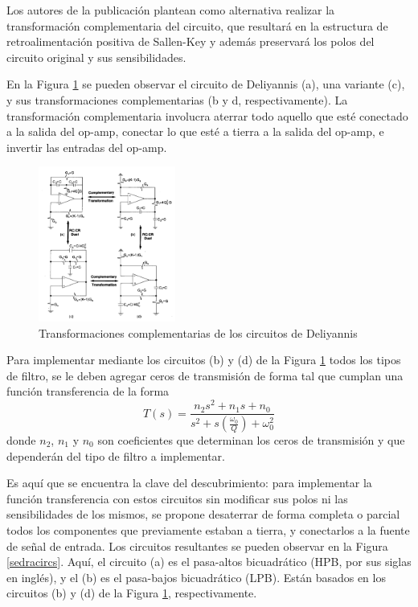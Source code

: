 \documentclass[spanish]{article}
\begin{document}
Los autores de la publicación plantean como alternativa realizar la transformación complementaria del circuito, que resultará en la estructura de retroalimentación positiva de Sallen-Key y además preservará los polos del circuito original y sus sensibilidades.

En la Figura \ref{salkey} se pueden observar el circuito de Deliyannis (a), una variante (c), y sus transformaciones complementarias (b y d, respectivamente). La transformación complementaria involucra aterrar todo aquello que esté conectado a la salida del op-amp, conectar lo que esté a tierra a la salida del op-amp, e invertir las entradas del op-amp.

\begin{figure}[H]
\begin{centering}
\includegraphics[width=0.4\textwidth]{Resources/sallenkeystructures.png}
\par\end{centering}
\caption{Transformaciones complementarias de los circuitos de Deliyannis}
\label{salkey}
\end{figure}

Para implementar mediante los circuitos (b) y (d) de la Figura \ref{salkey} todos los tipos de filtro, se le deben agregar ceros de transmisión de forma tal que cumplan una función transferencia de la forma 
\begin{equation*}
    T(s)=\frac{n_{2}s^2+n_{1}s+n_{0}}{s^2+s(\frac{\omega_{0}}{Q})+\omega_{0}^2}
\end{equation*}
donde $n_{2}$, $n_{1}$ y $n_{0}$ son coeficientes que determinan los ceros de transmisión y que dependerán del tipo de filtro a implementar.

Es aquí que se encuentra la clave del descubrimiento: para implementar la función transferencia con estos circuitos sin modificar sus polos ni las sensibilidades de los mismos, se propone desaterrar de forma completa o parcial todos los componentes que previamente estaban a tierra, y conectarlos a la fuente de señal de entrada. Los circuitos resultantes se pueden observar en la Figura \ref{sedracircs}. Aquí, el circuito (a) es el pasa-altos bicuadrático (HPB, por sus siglas en inglés), y el (b) es el pasa-bajos bicuadrático (LPB). Están basados en los circuitos (b) y (d) de la Figura \ref{salkey}, respectivamente.
\end{document}
